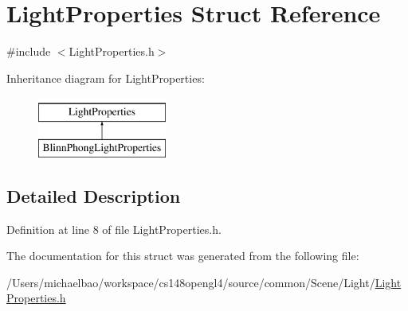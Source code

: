 \hypertarget{struct_light_properties}{}\section{Light\+Properties Struct Reference}
\label{struct_light_properties}


{\ttfamily \#include $<$Light\+Properties.\+h$>$}

Inheritance diagram for Light\+Properties\+:\begin{figure}[H]
\begin{center}
\leavevmode
\includegraphics[height=2.000000cm]{struct_light_properties}
\end{center}
\end{figure}


\subsection{Detailed Description}


Definition at line 8 of file Light\+Properties.\+h.



The documentation for this struct was generated from the following file\+:\begin{DoxyCompactItemize}
\item 
/\+Users/michaelbao/workspace/cs148opengl4/source/common/\+Scene/\+Light/\hyperlink{_light_properties_8h}{Light\+Properties.\+h}\end{DoxyCompactItemize}
